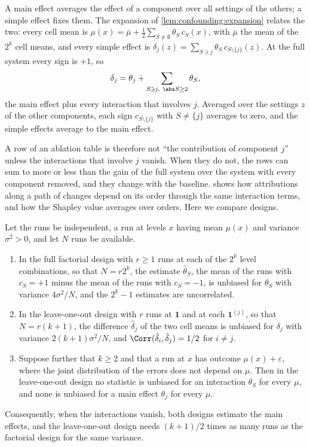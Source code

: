 \begin{refsection}
A main effect averages the effect of a component over all settings of the others; a simple effect fixes them. The expansion of \cref{lem:confounding:expansion} relates the two: every cell mean is $\mu(x)=\bar\mu+\frac12\sum_{S\ne\emptyset}\theta_S\,c_S(x)$, with $\bar\mu$ the mean of the $2^k$ cell means, and every simple effect is $\delta_j(z)=\sum_{S\ni j}\theta_S\,c_{S\setminus\{j\}}(z)$. At the full system every sign is $+1$, so
\begin{equation}\label{eq:ablations:loo}
\delta_j=\theta_j+\sum_{S\ni j,\ \abs S\ge2}\theta_S ,
\end{equation}
the main effect plus every interaction that involves $j$. Averaged over the settings $z$ of the other components, each sign $c_{S\setminus\{j\}}$ with $S\ne\{j\}$ averages to zero, and the simple effects average to the main effect.

A row of an ablation table is therefore not \enquote{the contribution of component $j$} unless the interactions that involve $j$ vanish. When they do not, the rows can sum to more or less than the gain of the full system over the system with every component removed, and they change with the baseline.  shows how attributions along a path of changes depend on its order through the same interaction terms, and how the Shapley value averages over orders. Here we compare designs.

\begin{theorem}\label{thm:ablations:ofat}
Let the runs be independent, a run at levels $x$ having mean $\mu(x)$ and variance $\sigma^2>0$, and let $N$ runs be available.
\begin{enumerate}
\item In the full factorial design with $r\ge1$ runs at each of the $2^k$ level combinations, so that $N=r2^k$, the estimate $\hat\theta_S$, the mean of the runs with $c_S=+1$ minus the mean of the runs with $c_S=-1$, is unbiased for $\theta_S$ with variance $4\sigma^2/N$, and the $2^k-1$ estimates are uncorrelated.
\item In the leave-one-out design with $r$ runs at $\mathbf 1$ and at each $\mathbf 1^{(j)}$, so that $N=r(k+1)$, the difference $\hat\delta_j$ of the two cell means is unbiased for $\delta_j$ with variance $2(k+1)\sigma^2/N$, and $\Corr(\hat\delta_i,\hat\delta_j)=1/2$ for $i\ne j$.
\item Suppose further that $k\ge2$ and that a run at $x$ has outcome $\mu(x)+\varepsilon$, where the joint distribution of the errors does not depend on $\mu$. Then in the leave-one-out design no statistic is unbiased for an interaction $\theta_S$ for every $\mu$, and none is unbiased for a main effect $\theta_j$ for every $\mu$.
\end{enumerate}
Consequently, when the interactions vanish, both designs estimate the main effects, and the leave-one-out design needs $(k+1)/2$ times as many runs as the factorial design for the same variance.
\end{theorem}


\end{refsection}
